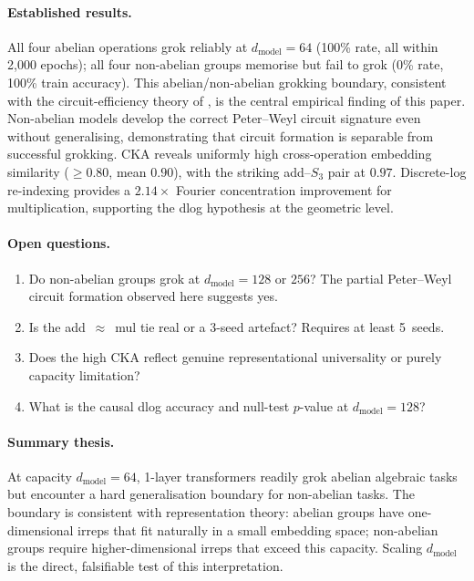 \documentclass[11pt]{article}
\begin{document}
\paragraph{Established results.}
All four abelian operations grok reliably at $d_{\text{model}}=64$
(100\% rate, all within 2,000 epochs); all four non-abelian groups
memorise but fail to grok (0\% rate, 100\% train accuracy).
This abelian/non-abelian grokking boundary, consistent with the
circuit-efficiency theory of \citet{varma2023explaining}, is the central
empirical finding of this paper. Non-abelian models develop the correct
Peter--Weyl circuit signature even without generalising, demonstrating
that circuit formation is separable from successful grokking. CKA reveals
uniformly high cross-operation embedding similarity ($\geq0.80$,
mean $0.90$), with the striking add--$S_3$ pair at $0.97$. Discrete-log
re-indexing provides a $2.14\times$ Fourier concentration improvement for
multiplication, supporting the dlog hypothesis at the geometric level.

\paragraph{Open questions.}
\begin{enumerate}
  \item Do non-abelian groups grok at $d_{\text{model}}=128$ or $256$?
        The partial Peter--Weyl circuit formation observed here suggests yes.
  \item Is the add~$\approx$~mul tie real or a 3-seed artefact?
        Requires at least 5~seeds.
  \item Does the high CKA reflect genuine representational universality or
        purely capacity limitation?
  \item What is the causal dlog accuracy and null-test $p$-value at
        $d_{\text{model}}=128$?
\end{enumerate}

\paragraph{Summary thesis.}
At capacity $d_{\text{model}}=64$, 1-layer transformers readily grok
abelian algebraic tasks but encounter a hard generalisation boundary for
non-abelian tasks. The boundary is consistent with representation theory:
abelian groups have one-dimensional irreps that fit naturally in a small
embedding space; non-abelian groups require higher-dimensional irreps that
exceed this capacity. Scaling $d_{\text{model}}$ is the direct,
falsifiable test of this interpretation.
\end{document}
